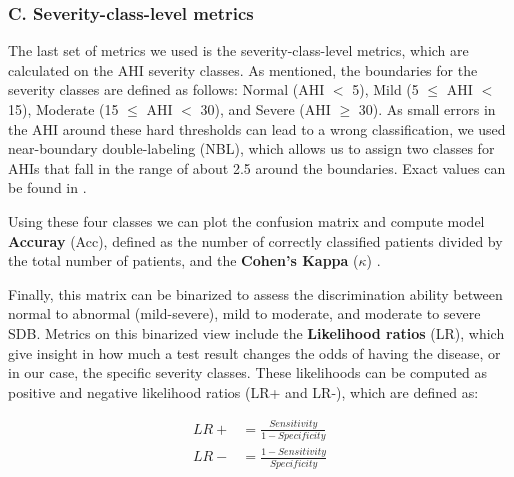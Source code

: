 \subsubsection*{C. Severity-class-level metrics}

The last set of metrics we used is the severity-class-level metrics, which are calculated on the AHI severity classes. As mentioned, the boundaries for the severity classes are defined as follows: Normal (AHI $<$ 5), Mild (5 $\le$ AHI $<$ 15), Moderate (15 $\le$ AHI $<$ 30), and Severe (AHI $\ge$ 30). As small errors in the AHI around these hard thresholds can lead to a wrong classification, we used near-boundary double-labeling (NBL), which allows us to assign two classes for AHIs that fall in the range of about 2.5 around the boundaries. Exact values can be found in .

Using these four classes we can plot the confusion matrix and compute model \textbf{Accuray} (Acc), defined as the number of correctly classified patients divided by the total number of patients, and the \textbf{Cohen's Kappa} ($\kappa$) .

Finally, this matrix can be binarized to assess the discrimination ability between normal to abnormal (mild-severe), mild to moderate, and moderate to severe SDB. 
Metrics on this binarized view include the \textbf{Likelihood ratios} (LR), which give insight in how much a test result changes the odds of having the disease, or in our case, the specific severity classes. These likelihoods can be computed as positive and negative likelihood ratios (LR+ and LR-), which are defined as:

\begin{align}
    LR+ &= \frac{Sensitivity}{1-Specificity} \\
    LR- &= \frac{1-Sensitivity}{Specificity} 
\end{align}